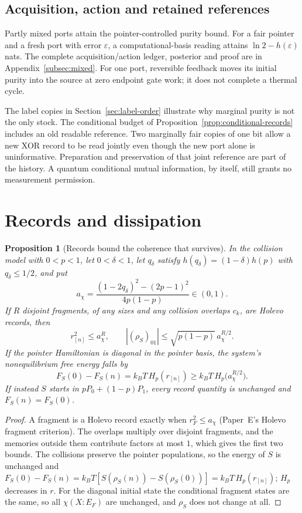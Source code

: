 \documentclass[12pt,a4paper]{article}
\newtheorem{proposition}[theorem]{Proposition}
\begin{document}
\subsection{Acquisition, action and retained references}

Partly mixed ports attain the pointer-controlled purity bound.
For a fair pointer and a fresh port with error $\varepsilon$,
a computational-basis reading attains
$\ln2-h(\varepsilon)$ nats. The complete acquisition/action ledger,
posterior and proof are in Appendix~\ref{subsec:mixed}.
For one port, reversible feedback moves its initial purity into the
source at zero endpoint gate work; it does not complete a thermal cycle.

The label copies in Section~\ref{sec:label-order} illustrate why
marginal purity is not the only stock. The conditional budget of
Proposition~\ref{prop:conditional-records} includes an old readable
reference. Two marginally fair copies of one bit allow a new XOR
record to be read jointly even though the new port alone is
uninformative. Preparation and preservation of that joint reference
are part of the history. A quantum conditional mutual information,
by itself, still grants no measurement permission.

\section{Records and dissipation}
\label{sec:dissipation}

\begin{proposition}[Records bound the coherence that survives]
\label{prop:coherence}
In the collision model with $0<p<1$, let $0<\delta<1$, let $q_\delta$ satisfy $h(q_\delta)=(1-\delta)h(p)$ with $q_\delta\le1/2$, and put
\[
a_\chi=\frac{(1-2q_\delta)^2-(2p-1)^2}{4p(1-p)}\in(0,1).
\]
If $R$ disjoint fragments, of any sizes and any collision overlaps $c_k$, are Holevo records, then
\[
r_{[n]}^2\le a_\chi^R,\qquad |(\rho_S)_{01}|\le\sqrt{p(1-p)}\,a_\chi^{R/2}.
\]
If the pointer Hamiltonian is diagonal in the pointer basis, the system's nonequilibrium free energy falls by
\[
F_S(0)-F_S(n)=k_BT\,H_p(r_{[n]})\ge k_BT\,H_p\bigl(a_\chi^{R/2}\bigr).
\]
If instead $S$ starts in $pP_0+(1-p)P_1$, every record quantity is unchanged and $F_S(n)=F_S(0)$.
\end{proposition}

\begin{proof}
A fragment is a Holevo record exactly when $r_F^2\le a_\chi$ (Paper~E's Holevo fragment criterion). The overlaps multiply over disjoint fragments, and the memories outside them contribute factors at most $1$, which gives the first two bounds. The collisions preserve the pointer populations, so the energy of $S$ is unchanged and $F_S(0)-F_S(n)=k_BT[S(\rho_S(n))-S(\rho_S(0))]=k_BT\,H_p(r_{[n]})$; $H_p$ decreases in $r$. For the diagonal initial state the conditional fragment states are the same, so all $\chi(X:E_F)$ are unchanged, and $\rho_S$ does not change at all.
\end{proof}
\end{document}
